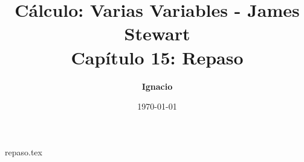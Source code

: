 \documentclass[11pt,spanish,oneside]{report}
\title{\textbf{Cálculo: Varias Variables - James Stewart} \\ \Large Capítulo 15: Repaso}
\author{\textbf{Ignacio}}
\date{\today}
\begin{document}
\maketitle

{repaso.tex}
\end{document}
